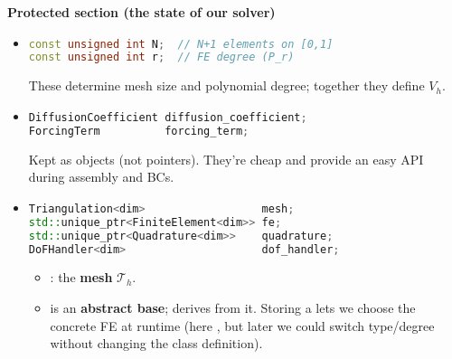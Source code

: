 \highspace
\begin{flushleft}
    \textcolor{Green3}{ \textbf{Protected section (the state of our solver)}}
\end{flushleft}
\begin{itemize}
    \item {}
    \begin{lstlisting}[language=C++]
const unsigned int N;  // N+1 elements on [0,1]
const unsigned int r;  // FE degree (P_r)
    \end{lstlisting}
    These determine mesh size and polynomial degree; together they define $V_h$.


    \item {}
    \begin{lstlisting}[language=C++]
DiffusionCoefficient diffusion_coefficient;
ForcingTerm          forcing_term;\end{lstlisting}
    Kept as objects (not pointers). They're cheap and provide an easy API during assembly and BCs.


    \item {}
    \begin{lstlisting}[language=C++]
Triangulation<dim>                  mesh;
std::unique_ptr<FiniteElement<dim>> fe;
std::unique_ptr<Quadrature<dim>>    quadrature;
DoFHandler<dim>                     dof_handler;\end{lstlisting}
    \begin{itemize}
        \item {}: the \textbf{mesh} $\mathcal{T}_h$.
        \item {} is an \textbf{abstract base};  derives from it. Storing a  lets we choose the concrete FE at runtime (here , but later we could switch type/degree without changing the class definition).


\end{itemize}
\end{itemize}
